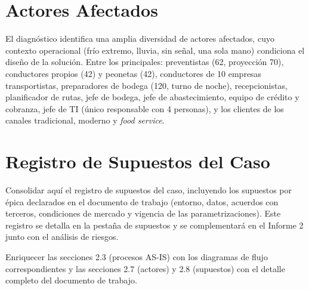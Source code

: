 \section{Actores Afectados}

El diagnóstico identifica una amplia diversidad de actores afectados, cuyo contexto
operacional (frío extremo, lluvia, sin señal, una sola mano) condiciona el diseño de la
solución. Entre los principales: preventistas (62, proyección 70), conductores propios
(42) y peonetas (42), conductores de 10 empresas transportistas, preparadores de bodega
(120, turno de noche), recepcionistas, planificador de rutas, jefe de bodega, jefe de
abastecimiento, equipo de crédito y cobranza, jefe de TI (único responsable con 4
personas), y los clientes de los canales tradicional, moderno y \emph{food service}.

\section{Registro de Supuestos del Caso}

\pendiente{} Consolidar aquí el registro de supuestos del caso, incluyendo los
supuestos por épica declarados en el documento de trabajo (entorno, datos, acuerdos con
terceros, condiciones de mercado y vigencia de las parametrizaciones). Este registro se
detalla en la pestaña de supuestos y se complementará en el Informe 2 junto con el
análisis de riesgos.

\vspace{4pt}
{\small\color{lafroxGrato}\pendiente{} Enriquecer las secciones 2.3 (procesos AS-IS) con
los diagramas de flujo correspondientes y las secciones 2.7 (actores) y 2.8 (supuestos)
con el detalle completo del documento de trabajo.}
